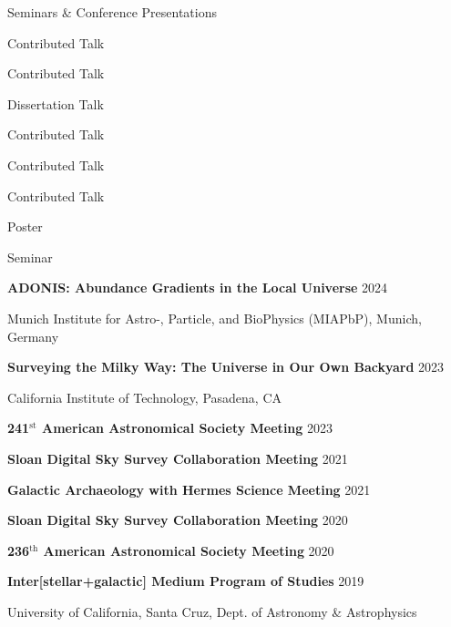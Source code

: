 \documentclass[cv.tex]{subfiles}
\begin{document}
\newpage
\noindent
{\color{themecolor} \large Seminars \& Conference Presentations}
\vspace{1mm}
\par\noindent
\parbox{0.18\textwidth}{%
	\raggedleft
	Contributed Talk \par
	\null \par
	Contributed Talk \par
	\null \par
	Dissertation Talk \par
	Contributed Talk \par
	Contributed Talk \par
	Contributed Talk \par
	Poster \par
	Seminar \par
	\null \par
}
\hspace{1mm}
\parbox{0.8\textwidth}{%
	\vspace{1mm}
	\textbf{ADONIS: Abundance Gradients in the Local Universe}
	\hfill 2024 \par
	Munich Institute for Astro-, Particle, and BioPhysics (MIAPbP),
	Munich, Germany \par
	\textbf{Surveying the Milky Way: The Universe in Our Own Backyard}
	\hfill 2023 \par
	California Institute of Technology, Pasadena, CA \par
	\textbf{241$^\text{st}$ American Astronomical Society Meeting}
	\hfill 2023 \par
	\textbf{Sloan Digital Sky Survey Collaboration Meeting}
	\hfill 2021 \par
	\textbf{Galactic Archaeology with Hermes Science Meeting}
	\hfill 2021 \par
	\textbf{Sloan Digital Sky Survey Collaboration Meeting}
	\hfill 2020 \par
	\textbf{236$^\text{th}$ American Astronomical Society Meeting}
	\hfill 2020 \par
	\textbf{Inter[stellar+galactic] Medium Program of Studies}
	\hfill 2019 \par
	University of California, Santa Cruz, Dept. of Astronomy \& Astrophysics
	\par
}
\end{document}
